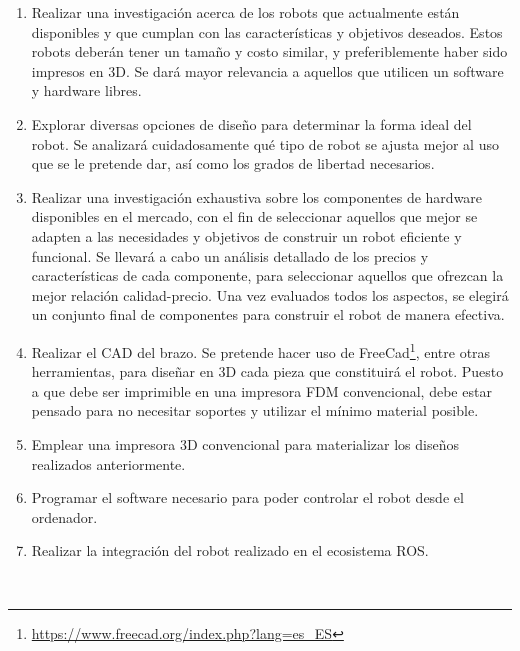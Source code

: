 \begin{enumerate}
    \item Realizar una investigación acerca de los robots que actualmente están disponibles y que cumplan con 
          las características y objetivos deseados. Estos robots deberán tener un tamaño y costo similar, y 
          preferiblemente haber sido impresos en 3D. Se dará mayor relevancia a aquellos que utilicen un software y hardware 
          libres.
    \item Explorar diversas opciones de diseño para determinar la forma ideal del robot. Se analizará cuidadosamente 
          qué tipo de robot se ajusta mejor al uso que se le pretende dar, así como los grados de libertad necesarios. 
            
    \item Realizar una investigación exhaustiva sobre los componentes de hardware disponibles en el mercado, con el fin de seleccionar 
          aquellos que mejor se adapten a las necesidades y objetivos de construir un robot eficiente y funcional. Se llevará 
          a cabo un análisis detallado de los precios y características de cada componente, para seleccionar aquellos 
          que ofrezcan la mejor relación calidad-precio. Una vez evaluados todos los aspectos, se elegirá un conjunto 
          final de componentes para construir el robot de manera efectiva. 
    
    \item Realizar el \ac{CAD} del brazo. Se pretende hacer uso de FreeCad\footnote{\url{https://www.freecad.org/index.php?lang=es_ES}}, entre otras herramientas, para
          diseñar en 3D cada pieza que constituirá el robot. Puesto a que debe ser imprimible en una impresora \acs{FDM} convencional,
          debe estar pensado para no necesitar soportes y utilizar el mínimo material posible.
    \item Emplear una impresora 3D convencional para materializar los diseños realizados anteriormente.
    \item Programar el software necesario para poder controlar el robot desde el ordenador.
    \item Realizar la integración del robot realizado en el ecosistema \ac{ROS}. 

  
\end{enumerate}\


